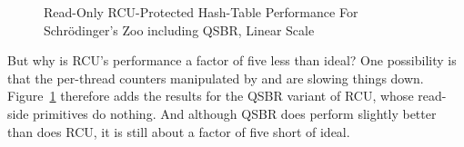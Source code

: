 \begin{figure}[tb]
\centering
{}
\caption{Read-Only RCU-Protected Hash-Table Performance For Schr\"odinger's Zoo including QSBR, Linear Scale}
\label{fig:datastruct:Read-Only RCU-Protected Hash-Table Performance For Schroedinger's Zoo including QSBR, Linear Scale}
\end{figure}

But why is RCU's performance a factor of five less than ideal?
One possibility is that the per-thread counters manipulated by
 and  are slowing things down.
Figure~\ref{fig:datastruct:Read-Only RCU-Protected Hash-Table Performance For Schroedinger's Zoo including QSBR, Linear Scale}
therefore adds the results for the QSBR variant of RCU, whose read-side
primitives do nothing.
And although QSBR does perform slightly better than does RCU, it is still
about a factor of five short of ideal.

